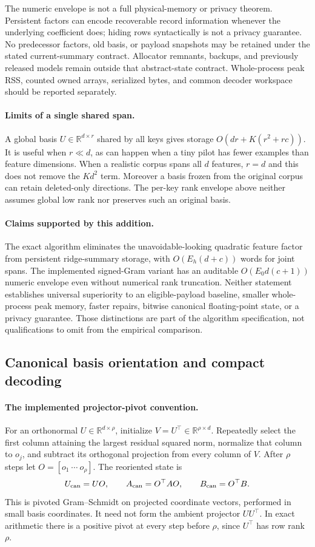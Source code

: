 \documentclass[11pt,a4paper]{article}
\begin{document}
The numeric envelope is not a full physical-memory or privacy theorem.
Persistent factors can encode recoverable record information whenever the
underlying coefficient does; hiding rows syntactically is not a privacy
guarantee. No predecessor factors, old basis, or payload snapshots may be
retained under the stated current-summary contract. Allocator remnants,
backups, and previously released models remain outside that abstract-state
contract. Whole-process peak RSS, counted owned arrays, serialized bytes,
and common decoder workspace should be reported separately.

\paragraph{Limits of a single shared span.}
A global basis $U\in\mathbb R^{d\times r}$ shared by all keys gives storage
$O(dr+K(r^2+rc))$. It is useful when $r\ll d$, as can happen when a tiny
pilot has fewer examples than feature dimensions. When a realistic corpus
spans all $d$ features, $r=d$ and this does not remove the $Kd^2$ term.
Moreover a basis frozen from the original corpus can retain deleted-only
directions. The per-key rank envelope above neither assumes global low rank
nor preserves such an original basis.

\paragraph{Claims supported by this addition.}
The exact algorithm eliminates the unavoidable-looking quadratic feature
factor from persistent ridge-summary storage, with $O(E_h(d+c))$ words for
joint spans. The implemented signed-Gram variant has an auditable
$O(E_0d(c+1))$ numeric envelope even without numerical rank truncation.
Neither statement establishes universal superiority to an eligible-payload
baseline, smaller whole-process peak memory, faster repairs, bitwise
canonical floating-point state, or a privacy guarantee. Those distinctions
are part of the algorithm specification, not qualifications to omit from
the empirical comparison.

\subsection{Canonical basis orientation and compact decoding}
\paragraph{The implemented projector-pivot convention.}
For an orthonormal $U\in\mathbb R^{d\times\rho}$, initialize
$V=U^\top\in\mathbb R^{\rho\times d}$. Repeatedly select the first column
attaining the largest residual squared norm, normalize that column to
$o_j$, and subtract its orthogonal projection from every column of $V$.
After $\rho$ steps let $O=[o_1\ \cdots\ o_\rho]$. The reoriented state is
\[
 U_{\rm can}=UO,\qquad A_{\rm can}=O^\top AO,\qquad
 B_{\rm can}=O^\top B.
\]
This is pivoted Gram--Schmidt on projected coordinate vectors, performed
in small basis coordinates. It need not form the ambient projector
$UU^\top$. In exact arithmetic there is a positive pivot at every step
before $\rho$, since $U^\top$ has row rank $\rho$.
\end{document}
